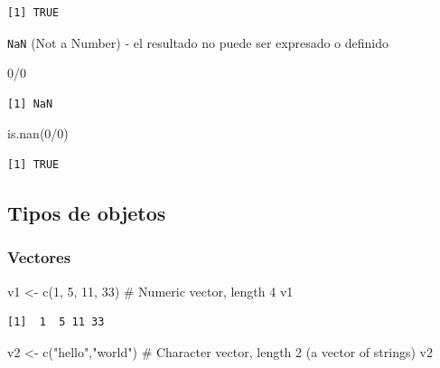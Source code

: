 \documentclass[
  letterpaper,
  DIV=11,
  numbers=noendperiod]{scrartcl}
\newenvironment{Shaded}{\begin{snugshade}}{\end{snugshade}}
\newcommand{\CommentTok}[1]{\textcolor[rgb]{0.37,0.37,0.37}{#1}}
\newcommand{\DecValTok}[1]{\textcolor[rgb]{0.68,0.00,0.00}{#1}}
\newcommand{\FunctionTok}[1]{\textcolor[rgb]{0.28,0.35,0.67}{#1}}
\newcommand{\NormalTok}[1]{\textcolor[rgb]{0.00,0.23,0.31}{#1}}
\newcommand{\OtherTok}[1]{\textcolor[rgb]{0.00,0.23,0.31}{#1}}
\newcommand{\SpecialCharTok}[1]{\textcolor[rgb]{0.37,0.37,0.37}{#1}}
\newcommand{\StringTok}[1]{\textcolor[rgb]{0.13,0.47,0.30}{#1}}
\begin{document}
\begin{verbatim}
[1] TRUE
\end{verbatim}

\texttt{NaN} (Not a Number) - el resultado no puede ser expresado o
definido

\begin{Shaded}
\begin{Highlighting}[]
\DecValTok{0}\SpecialCharTok{/}\DecValTok{0}
\end{Highlighting}
\end{Shaded}

\begin{verbatim}
[1] NaN
\end{verbatim}

\begin{Shaded}
\begin{Highlighting}[]
\FunctionTok{is.nan}\NormalTok{(}\DecValTok{0}\SpecialCharTok{/}\DecValTok{0}\NormalTok{)}
\end{Highlighting}
\end{Shaded}

\begin{verbatim}
[1] TRUE
\end{verbatim}

\subsection{Tipos de objetos}\label{tipos-de-objetos}

\subsubsection{Vectores}\label{vectores}

\begin{Shaded}
\begin{Highlighting}[]
\NormalTok{v1 }\OtherTok{\textless{}{-}} \FunctionTok{c}\NormalTok{(}\DecValTok{1}\NormalTok{, }\DecValTok{5}\NormalTok{, }\DecValTok{11}\NormalTok{, }\DecValTok{33}\NormalTok{)       }\CommentTok{\# Numeric vector, length 4}
\NormalTok{v1}
\end{Highlighting}
\end{Shaded}

\begin{verbatim}
[1]  1  5 11 33
\end{verbatim}

\begin{Shaded}
\begin{Highlighting}[]
\NormalTok{v2 }\OtherTok{\textless{}{-}} \FunctionTok{c}\NormalTok{(}\StringTok{"hello"}\NormalTok{,}\StringTok{"world"}\NormalTok{)    }\CommentTok{\# Character vector, length 2 (a vector of strings)}
\NormalTok{v2}
\end{Highlighting}
\end{Shaded}
\end{document}
